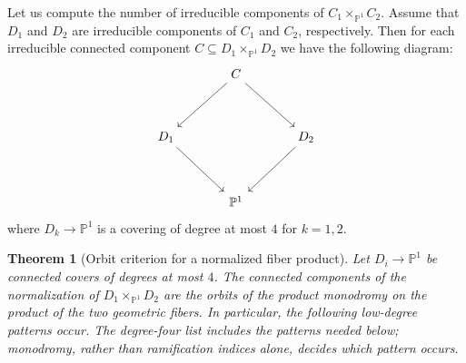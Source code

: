 \documentclass[a4paper]{amsart}
\theoremstyle{plain}
\newtheorem{Thm}{Theorem}[section]
\theoremstyle{definition}
\theoremstyle{remark}
\numberwithin{equation}{section}
\newcommand{\PP}{\mathbb{P}}
\begin{document}
Let us compute the number of irreducible components of $C_{1}\times_{\PP^{1}} C_{2}$. Assume that $D_{1}$ and $D_{2}$ are irreducible components of $C_{1}$ and $C_{2}$, respectively. Then for each irreducible connected component $C\subseteq D_{1}\times_{\PP^{1}} D_{2}$ we have the following diagram:
\begin{displaymath}
	\begin{tikzcd}[column sep=35pt, row sep=35pt]
		& C \ar[dr,""'] \ar[dl,""]\\
		D_{1} \ar[dr,""'] & & D_{2} \ar[dl,""] \\
		& \PP^{1} &
	\end{tikzcd}
\end{displaymath}
where $D_{k}\to \PP^{1}$ is a covering of degree at most $4$ for $k=1,2$.

\begin{Thm}[Orbit criterion for a normalized fiber product]\label{fund}
Let $D_i\to\PP^1$ be connected covers of degrees at most $4$.  The
connected components of the normalization of
$D_1\times_{\PP^1}D_2$ are the orbits of the product monodromy on the
product of the two geometric fibers.  In particular, the following
low-degree patterns occur.  The degree-four list includes the patterns
needed below; monodromy, rather than ramification indices alone, decides
which pattern occurs.
\end{Thm}
\end{document}
